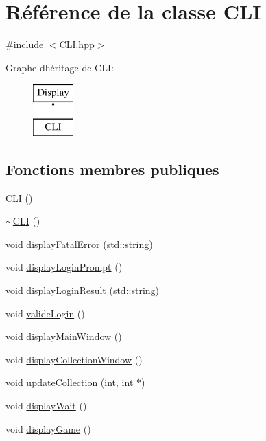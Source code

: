 \hypertarget{classCLI}{}\section{Référence de la classe C\+L\+I}
\label{classCLI}


{\ttfamily \#include $<$C\+L\+I.\+hpp$>$}

Graphe d\textquotesingle{}héritage de C\+L\+I\+:\begin{figure}[H]
\begin{center}
\leavevmode
\includegraphics[height=2.000000cm]{classCLI}
\end{center}
\end{figure}
\subsection*{Fonctions membres publiques}
\begin{DoxyCompactItemize}
\item 
\hyperlink{classCLI_a1a5b0f7ec3b242c5c56e4745adbb391e}{C\+L\+I} ()
\item 
\hyperlink{classCLI_a9f59d57abf434f7161fcf3f61b725752}{$\sim$\+C\+L\+I} ()
\item 
void \hyperlink{classCLI_ae86da329edfde03f238c778481be2030}{display\+Fatal\+Error} (std\+::string)
\item 
void \hyperlink{classCLI_a6cf4acf9f7fa587cc49b892487c68f13}{display\+Login\+Prompt} ()
\item 
void \hyperlink{classCLI_abf864752edc73dba33fce8a0f06137c4}{display\+Login\+Result} (std\+::string)
\item 
void \hyperlink{classCLI_ac900759039333051b414c9002dd2100c}{valide\+Login} ()
\item 
void \hyperlink{classCLI_abcf6f643c8a94e0451b4b6d9ab9546c7}{display\+Main\+Window} ()
\item 
void \hyperlink{classCLI_af20da7ff64f241fdd3659b66ffacedd4}{display\+Collection\+Window} ()
\item 
void \hyperlink{classCLI_acc4aa511cf5ee13f00323fd7d4e8a4b1}{update\+Collection} (int, int $\ast$)
\item 
void \hyperlink{classCLI_ab6c8531d0ab6d343936a83edbb14703c}{display\+Wait} ()
\item 
void \hyperlink{classCLI_acef2afe60b53453ebf7ed52f4f06621e}{display\+Game} ()
\end{DoxyCompactItemize}



